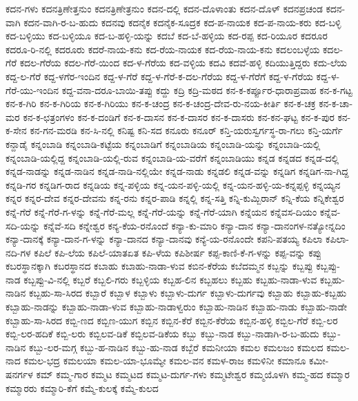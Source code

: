 ಕದನ-ಗಳು
ಕದನತ್ರಿಣೇತ್ತನುಂ
ಕದನತ್ರಿಣೇತ್ರನುಂ
ಕದನ-ದಲ್ಲಿ
ಕದನ-ದೊಳಾಂತು
ಕದನ-ದೊಳ್
ಕದನಪ್ರಚಂಡ
ಕದನ-ವಾಗಿ
ಕದನ-ವಾಗಿ-ರ-ಬ-ಹುದು
ಕದನವು
ಕದನೈಕ
ಕದನೈಕ-ಸೂದ್ರಕ
ಕದ-ಪ-ನಾಯಕ
ಕದ-ಪ-ನಾಯ-ಕರು
ಕದ-ಬಳ್ಳಿ
ಕದ-ಬಳ್ಳಿಯು
ಕದ-ಬಳ್ಳಿಯೂ
ಕದ-ಬ-ಹಳ್ಳಿ-ಯನ್ನು
ಕದಬೆ
ಕದ-ಬೆ-ಹಳ್ಳಿಯ
ಕದ-ರಪ್ಪ
ಕದ-ರಿಯೂರ
ಕದರೂರ
ಕದರೂ-ರಿ-ನಲ್ಲಿ
ಕದರೂರು
ಕದರೆ-ನಾಯ-ಕನು
ಕದ-ರೆಯ-ನಾಯಕ
ಕದ-ರೆಯ-ನಾಯ-ಕನು
ಕದಲಂಬಳ್ಳೆಯ
ಕದಲ-ಗೆರೆ
ಕದಲ-ಗೆರೆಯ
ಕದಲ-ಗೆರೆ-ಯಿಂದ
ಕದ-ಳ-ಗೆರೆಯ
ಕದ-ವಳ್ಳಿಯ
ಕದವಿ
ಕದವೆ-ಹಳ್ಳಿ
ಕದಿಯುತ್ತಿದ್ದರು
ಕದು-ಲೆಯ
ಕದ್ದ-ಲ-ಗೆರೆ
ಕದ್ದ-ಳಗೆರ-ಇಂದಿನ
ಕದ್ದ-ಳ-ಗೆರೆ
ಕದ್ದ-ಳ-ಗೆರೆ-ಕ-ದಲ-ಗೆರೆಯ
ಕದ್ದ-ಳ-ಗೆರೆಗೆ
ಕದ್ದ-ಳ-ಗೆರೆಯ
ಕದ್ದ-ಳ-ಗೆರೆ-ಯು-ಇಂದಿನ
ಕದ್ದ-ವನಾ-ದರೂ-ಬಾಯಿ-ತಪ್ಪು
ಕದ್ದು
ಕದ್ರಿ
ಕದ್ರಿ-ಮಠದ
ಕನ-ಕ-ಕರ್ಪ್ಪೂರ-ಧಾರಾಪ್ರವಾಹ
ಕನ-ಕ-ಗಟ್ಟ
ಕನ-ಕ-ಗಿರಿ
ಕನ-ಕ-ಗಿರಿಯ
ಕನ-ಕ-ಗಿರಿಯು
ಕನ-ಕ-ಚಂದ್ರ
ಕನ-ಕ-ಚಂದ್ರ-ದೇವ-ರು-ನಯ-ಕೀರ್ತಿ
ಕನ-ಕ-ಚಕ್ರ
ಕನ-ಕ-ಚಾ-ಮರ
ಕನ-ಕ-ಛತ್ರಂಗಳಂ
ಕನ-ಕ-ದಂಡಿಗೆ
ಕನ-ಕ-ದಾಸನ
ಕನ-ಕ-ದಾಸರ
ಕನ-ಕ-ದಾಸರು
ಕನ-ಕನ-ಘಟ್ಟ
ಕನ-ಕ-ಪುರ
ಕನ-ಕ-ಸೇನ
ಕನ-ಗನ-ಮರಡಿ
ಕನ-ಸಿ-ನಲ್ಲಿ
ಕನಿಷ್ಟ
ಕನಿ-ಸದ
ಕನೂರು
ಕನೂರ್
ಕನ್ತಿ-ಯರುಸ್ವರ್ಗಸ್ಥ-ರಾ-ಗಲು
ಕನ್ತಿ-ಯರ್ಗೆ
ಕನ್ದಾಡೈ
ಕನ್ನಂಬಾಡಿ
ಕನ್ನಂಬಾಡಿ-ಕಟ್ಟೆಯ
ಕನ್ನಂಬಾಡಿಗೆ
ಕನ್ನಂಬಾಡಿಯ
ಕನ್ನಂಬಾಡಿ-ಯನ್ನು
ಕನ್ನಂಬಾಡಿ-ಯಲ್ಲಿ
ಕನ್ನಂಬಾಡಿ-ಯಲ್ಲಿದ್ದ
ಕನ್ನಂಬಾಡಿ-ಯಲ್ಲಿ-ರುವ
ಕನ್ನಂಬಾಡಿ-ಯ-ವರೆಗೆ
ಕನ್ನಂಬಾಡಿಯು
ಕನ್ನಡ
ಕನ್ನಡದ
ಕನ್ನಡ-ದಲ್ಲಿ
ಕನ್ನಡ-ನಾಡನ್ನು
ಕನ್ನಡ-ನಾಡಿನ
ಕನ್ನಡ-ನಾಡಿ-ನಲ್ಲಿಯೇ
ಕನ್ನಡ-ನಾಡು
ಕನ್ನಡಲಿ
ಕನ್ನಡ-ವನ್ನು
ಕನ್ನಡಿಗ
ಕನ್ನಡಿಗ-ನಾ-ಗಿದ್ದ
ಕನ್ನಡಿ-ಗರ
ಕನ್ನಡಿಗ-ರಾದ
ಕನ್ನಡಿಯ
ಕನ್ನ-ಪಳ್ಳಿಯ
ಕನ್ನ-ಯನ-ಪಳ್ಳಿ-ಯಲ್ಲಿ
ಕನ್ನ-ಯನ-ಹಳ್ಳಿ-ಯ-ಕನ್ನಪ್ಪಳ್ಳಿ
ಕನ್ನಯ್ಯನ
ಕನ್ನರ
ಕನ್ನರ-ದೇವ
ಕನ್ನರ-ದೇವನು
ಕನ್ನ-ರನು
ಕನ್ನರ-ಪಾಡಿ
ಕನ್ನಲ್ಲಿ
ಕನ್ನ-ಸತ್ತಿ
ಕನ್ನಿ-ಕುಮ್ಬಿರಾನ್
ಕನ್ನಿ-ಕೆಯ
ಕನ್ನಿಕೇಶ್ವರ
ಕನ್ನೆ-ಗೆರೆ
ಕನ್ನೆ-ಗೆರೆ-ಗ-ಳನ್ನು
ಕನ್ನೆ-ಗೆರೆ-ಮಲ್ಲ
ಕನ್ನೆ-ಗೆರೆ-ಯನ್ನು
ಕನ್ನೆ-ಗೆರೆ-ಯಾಗಿ
ಕನ್ನೆಯನ
ಕನ್ನೆವಸ-ದಿಯಂ
ಕನ್ನೆವ-ಸದಿ-ಯನ್ನು
ಕನ್ನೆವೆ-ಸದಿ
ಕನ್ನೇಶ್ವರ
ಕನ್ಯ-ಕೆಯ-ರನೊಂದೆ
ಕನ್ಯಾ-ಕು-ಮಾರಿ
ಕನ್ಯಾ-ದಾನ
ಕನ್ಯಾ-ದಾನಂಗಳ-ನತ್ಯೋನ್ನದಿಂ
ಕನ್ಯಾ-ದಾನಕ್ಕೆ
ಕನ್ಯಾ-ದಾನ-ಗ-ಳನ್ನು
ಕನ್ಯಾ-ದಾನದ
ಕನ್ಯಾ-ದಾನವು
ಕನ್ಯೆ-ಯ-ರನೊಂದೇ
ಕಪನಿ-ಪತಯ್ಯ
ಕಪಿಲಾ
ಕಪಿಲಾ-ನದಿ-ಗಳ
ಕಪಿಲೆ
ಕಪಿ-ಲೆಯ
ಕಪಿಲೆ-ಯಾತಏತ
ಕಪಿ-ಳೆಯ
ಕಪಿಶೀರ್ಷ
ಕಪ್ಪ-ಕಾಣಿ-ಕೆ-ಗ-ಳನ್ನು
ಕಪ್ಪ-ವನ್ನು
ಕಪ್ಪು
ಕಬರಸ್ಥಾನಕ್ಕಾಗಿ
ಕಬರಸ್ಥಾನದ
ಕಬಾಹು
ಕಬಾಹು-ನಾಡಾ-ಳುವ
ಕಬಿನ-ಕೆರೆಯ
ಕಬೆದಮ್ಮನ
ಕಬ್ಬನ್ನು
ಕಬ್ಬಪ್ಪು
ಕಬ್ಬಪ್ಪು-ನಾಡ
ಕಬ್ಬಪ್ಪು-ವಿ-ನಲ್ಲಿ
ಕಬ್ಬರೆ
ಕಬ್ಬಲಿ-ಗರು
ಕಬ್ಬಳ್ಳಿಯ
ಕಬ್ಬಹ-ಲಿನ
ಕಬ್ಬಹಲು
ಕಬ್ಬಹು
ಕಬ್ಬಹು-ನಾಡಾ-ಳುವ
ಕಬ್ಬಹು-ನಾಡಿನ
ಕಬ್ಬಹು-ಸಾ-ಸಿರದ
ಕಬ್ಬಾರೆ
ಕಬ್ಬಾಳ
ಕಬ್ಬಾಳು
ಕಬ್ಬಾಳು-ದುರ್ಗ
ಕಬ್ಬಾಳು-ದುರ್ಗವು
ಕಬ್ಬಾಹು
ಕಬ್ಬಾಹು-ಕಬ್ಬಹು
ಕಬ್ಬಾಹು-ನಾಡನ್ನು
ಕಬ್ಬಾಹು-ನಾಡಾ-ಳುವ
ಕಬ್ಬಾಹು-ನಾಡಾಳ್ವರುಂ
ಕಬ್ಬಾಹು-ನಾಡಿನ
ಕಬ್ಬಾಹು-ನಾಡು
ಕಬ್ಬಾಹು-ನಾಡೇ
ಕಬ್ಬಾಹು-ಸಾ-ಸಿರದ
ಕಬ್ಬಿ-ಣದ
ಕಬ್ಬಿಣ-ಯುಗ
ಕಬ್ಬಿನ
ಕಬ್ಬಿನ-ಕೆರೆ
ಕಬ್ಬಿನ-ಕೆರೆಯ
ಕಬ್ಬಿನ-ಹಳ್ಳಿ
ಕಬ್ಬಿಲ-ಗೆರೆ
ಕಬ್ಬಿ-ಲರ
ಕಬ್ಬಿ-ಲರ-ಹದಿಕೆ
ಕಬ್ಬಿ-ಲರು
ಕಬ್ಬಿಲವ-ಡಿಕೆ
ಕಬ್ಬಿಲವ-ಡಿಕೆಯ
ಕಬ್ಬು
ಕಬ್ಬು-ನಾಡ
ಕಬ್ಬು-ನಾಡಾಗಿ-ರ-ಬ-ಹುದು
ಕಬ್ಬು-ನಾಡಿನ
ಕಬ್ಬು-ಲರ-ಮಗ್ಗ
ಕಬ್ಬು-ಹ-ನಾಡಿನ
ಕಬ್ಬು-ಹು-ನಾಡ
ಕಬ್ಬೆರೆ
ಕಮನೀಯಾ
ಕಮಲ
ಕಮಲಜಂ
ಕಮಲದ
ಕಮಲ-ನಾದ
ಕಮಲ-ಭದ್ರ
ಕಮಲಯಾ
ಕಮಲ-ಯಾ-ಭೂಮ್ಯೇ
ಕಮಲ-ವನ
ಕಮಳ-ರಾಜ
ಕಮಳಿನೀ
ಕಮಾನೂ
ಕಮೀ-ಷನರ್ಗಳ
ಕಮ್
ಕಮ್ಮ-ಗಾರ
ಕಮ್ಮಟ
ಕಮ್ಮಟದ
ಕಮ್ಮಟ-ದುರ್ಗ-ಗಳು
ಕಮ್ಮಟೇಶ್ವರ
ಕಮ್ಮಯೊಳಗಿ
ಕಮ್ಮ-ಹದ
ಕಮ್ಮಾರ
ಕಮ್ಮಾರರು
ಕಮ್ಮಾರಿ-ಕೆಗೆ
ಕಮ್ಮೆ-ಕುಲಕ್ಕೆ
ಕಮ್ಮೆ-ಕುಲದ
